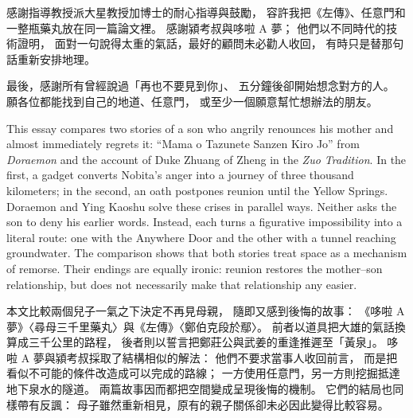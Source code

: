 \documentclass{ntu-minimal-thesis}
\begin{document}
\makecover
\makeapprovalpage

\begin{acknowledgements}
感謝指導教授派大星教授加博士的耐心指導與鼓勵，
容許我把《左傳》、任意門和一整瓶藥丸放在同一篇論文裡。
感謝潁考叔與哆啦 A 夢；
他們以不同時代的技術證明，
面對一句說得太重的氣話，最好的顧問未必勸人收回，
有時只是替那句話重新安排地理。

最後，感謝所有曾經說過「再也不要見到你」、
五分鐘後卻開始想念對方的人。
願各位都能找到自己的地道、任意門，
或至少一個願意幫忙想辦法的朋友。
\end{acknowledgements}

\begin{abstracten}
This essay compares two stories of a son who angrily renounces his mother
and almost immediately regrets it:
``Mama o Tazunete Sanzen Kiro Jo'' from \emph{Doraemon}
and the account of Duke Zhuang of Zheng in the \emph{Zuo Tradition}.
In the first, a gadget converts Nobita's anger into a journey of three thousand kilometers;
in the second, an oath postpones reunion until the Yellow Springs.
Doraemon and Ying Kaoshu solve these crises in parallel ways.
Neither asks the son to deny his earlier words.
Instead, each turns a figurative impossibility into a literal route:
one with the Anywhere Door and the other with a tunnel reaching groundwater.
The comparison shows that both stories treat space as a mechanism of remorse.
Their endings are equally ironic: reunion restores the mother--son relationship,
but does not necessarily make that relationship any easier.

\end{abstracten}

\begin{abstractzh}
本文比較兩個兒子一氣之下決定不再見母親，
隨即又感到後悔的故事：
《哆啦 A 夢》〈尋母三千里藥丸〉與《左傳》〈鄭伯克段於鄢〉。
前者以道具把大雄的氣話換算成三千公里的路程，
後者則以誓言把鄭莊公與武姜的重逢推遲至「黃泉」。
哆啦 A 夢與潁考叔採取了結構相似的解法：
他們不要求當事人收回前言，
而是把看似不可能的條件改造成可以完成的路線；
一方使用任意門，另一方則挖掘抵達地下泉水的隧道。
兩篇故事因而都把空間變成呈現後悔的機制。
它們的結局也同樣帶有反諷：
母子雖然重新相見，原有的親子關係卻未必因此變得比較容易。

\end{abstractzh}

\makethesistableofcontents
\thesismainmatter
\end{document}
